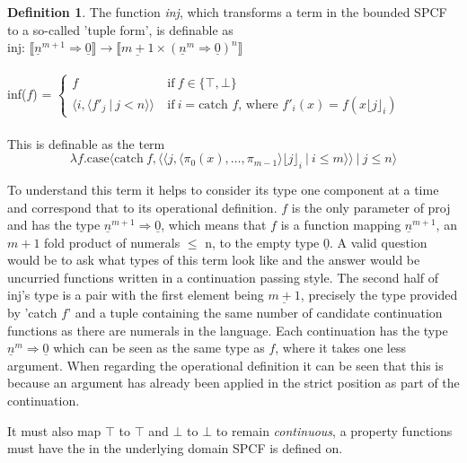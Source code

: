 \documentclass[12pt,a4paper]{report}
\theoremstyle{definition}
\newtheorem{definition}{Definition}[chapter]%
\theoremstyle{remark}
\begin{document}
\begin{definition}
    The function \emph{inj}, which transforms a term in the bounded SPCF to a so-called 'tuple form', is definable as \\
    inj: $\llbracket \underline{n}^{m+1} \Rightarrow \underline{0} \rrbracket \rightarrow \llbracket \underline{m + 1} \times (\underline{n}^{m} \Rightarrow \underline{0})^n \rrbracket$\\\\
    inf($f$) =
    $\begin{cases}
        f &\text{if}\ f \in \{\top, \bot\}\\
        \langle i, \langle f'_j\ |\ j < n \rangle \rangle\ &\text{if}\ i = \text{catch } f  \text{, where } f'_i(x) =  f(x \lfloor j \rfloor_i)
    \end{cases}$\\\\
   This is definable as the term
    \[
    \lambda f.\text{case}\langle \text{catch}\ f, \langle \langle j, \langle \pi_0(x),\dots,\pi_{m-1}\rangle \lfloor j \rfloor_i\ |\ i \leq m \rangle \rangle\ |\ j \le n \rangle
    \]
\end{definition}

To understand this term it helps to consider its type one component at a time and correspond that to its operational definition. $f$ is the only parameter of proj and has the type $\underline{n}^{m+1} \Rightarrow \underline{0}$, which means that $f$ is a function mapping $\underline{n}^{m+1}$, an $m+1$ fold product of numerals $\le$ n, to the empty type $\underline{0}$. A valid question would be to ask what types of this term look like and the answer would be uncurried functions written in a continuation passing style. The second half of inj's type is a pair with the first element being $\underline{m+1}$, precisely the type provided by 'catch $f$' and a tuple containing the same number of candidate continuation functions as there are numerals in the language. Each continuation has the type $\underline{n}^{m} \Rightarrow \underline{0}$ which can be seen as the same type as $f$, where it takes one less argument. When regarding the operational definition it can be seen that this is because an argument has already been applied in the strict position as part of the continuation.

It must also map $\top$ to $\top$ and $\bot$ to $\bot$ to remain \emph{continuous}, a property functions must have the in the underlying domain SPCF is defined on.
\end{document}
